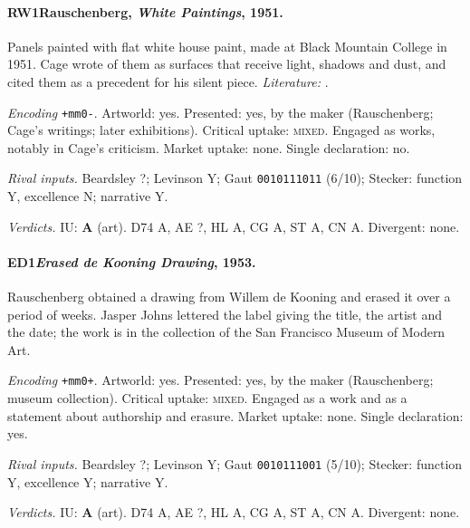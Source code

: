 \paragraph{RW1\enspace Rauschenberg, \emph{White Paintings}, 1951.}
Panels painted with flat white house paint, made at Black Mountain College in 1951. Cage wrote of them as surfaces that receive light, shadows and dust, and cited them as a precedent for his silent piece. \textit{Literature:} \citet{Cage1961}.\par
\noindent\textit{Encoding} \texttt{+mm0-}. Artworld: yes. Presented: yes, by the maker (Rauschenberg; Cage's writings; later exhibitions). Critical uptake: \textsc{mixed}. Engaged as works, notably in Cage's criticism. Market uptake: none. Single declaration: no.\par
\noindent\textit{Rival inputs.} Beardsley ?; Levinson Y; Gaut \texttt{0010111011} (6/10); Stecker: function Y, excellence N; narrative Y.\par
\noindent\textit{Verdicts.} IU: \textbf{A} (art). D74 A, AE ?, HL A, CG A, ST A, CN A. Divergent: none.\par

\paragraph{ED1\enspace \emph{Erased de Kooning Drawing}, 1953.}
Rauschenberg obtained a drawing from Willem de Kooning and erased it over a period of weeks. Jasper Johns lettered the label giving the title, the artist and the date; the work is in the collection of the San Francisco Museum of Modern Art.\par
\noindent\textit{Encoding} \texttt{+mm0+}. Artworld: yes. Presented: yes, by the maker (Rauschenberg; museum collection). Critical uptake: \textsc{mixed}. Engaged as a work and as a statement about authorship and erasure. Market uptake: none. Single declaration: yes.\par
\noindent\textit{Rival inputs.} Beardsley ?; Levinson Y; Gaut \texttt{0010111001} (5/10); Stecker: function Y, excellence Y; narrative Y.\par
\noindent\textit{Verdicts.} IU: \textbf{A} (art). D74 A, AE ?, HL A, CG A, ST A, CN A. Divergent: none.\par

